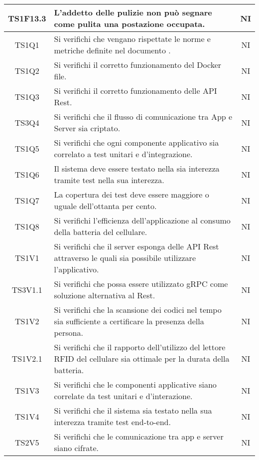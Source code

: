 \begin{center}
\begin{longtable}{|c|p{10cm}|c|}
			\hline
			TS1F13.3 & L'addetto delle pulizie non può segnare come pulita una postazione occupata. & NI \\	
			\hline
			TS1Q1 & Si verifichi che vengano rispettate le norme e metriche definite nel documento \dext{Piano di Qualifica v. 1.0.0}. & NI \\	
			\hline			
			TS1Q2 & Si verifichi il corretto funzionamento del Docker file. & NI \\	
			\hline		
			TS1Q3 & Si verifichi il corretto funzionamento delle API Rest. & NI \\	
			\hline	
			TS3Q4 & Si verifichi che il flusso di comunicazione tra App e Server sia criptato. & NI \\	
			\hline
			TS1Q5 & Si verifichi che ogni componente applicativo sia correlato a test unitari e d'integrazione. & NI \\	
			\hline
			TS1Q6 & Il sistema deve essere testato nella sia interezza tramite test nella sua interezza. & NI \\	
			\hline
			TS1Q7 & La copertura dei test deve essere maggiore o uguale dell'ottanta per cento. & NI \\	
			\hline
			TS1Q8 & Si verifichi l'efficienza dell'applicazione al consumo della batteria del cellulare. & NI \\	
			\hline
			TS1V1 & Si verifichi che il server esponga delle API Rest attraverso le quali sia possibile utilizzare l'applicativo. & NI \\	
			\hline
			TS3V1.1 & Si verifichi che possa essere utilizzato gRPC come soluzione alternativa al Rest. & NI \\	
			\hline
			TS1V2 & Si verifichi che la scansione dei codici nel tempo sia sufficiente a certificare la presenza della persona. & NI \\	
			\hline
			TS1V2.1 & Si verifichi che il rapporto dell'utilizzo del lettore RFID del cellulare sia ottimale per la durata della batteria. & NI \\	
			\hline
			TS1V3 & Si verifichi che le componenti applicative siano correlate da test unitari e d'interazione. & NI \\	
			\hline
			TS1V4 & Si verifichi che il sistema sia testato nella sua interezza tramite test end-to-end. & NI \\	
			\hline
			TS2V5 & Si verifichi che le comunicazione tra app e server siano cifrate. & NI \\	

\end{longtable}
\end{center}

